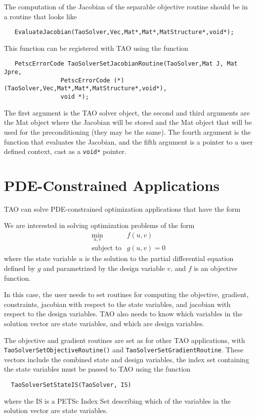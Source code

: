 The computation of the Jacobian of the separable objective routine 
should be in a routine that looks like
\begin{verbatim}
   EvaluateJacobian(TaoSolver,Vec,Mat*,Mat*,MatStructure*,void*);
\end{verbatim}
This function can be registered with TAO using the function
\begin{verbatim}
   PetscErrorCode TaoSolverSetJacobianRoutine(TaoSolver,Mat J, Mat Jpre,
                PetscErrorCode (*)(TaoSolver,Vec,Mat*,Mat*,MatStructure*,void*),
                void *);
\end{verbatim}
The first argument is the TAO solver object, the second and third arguments
are the Mat object where the Jacobian will be stored and the Mat object
that will be used for the preconditioning (they may be the same). The fourth 
argument is the function that evaluates the Jacobian, 
and the fifth argument is a pointer to a user defined context,
cast as a {\tt void*} pointer.

\section{PDE-Constrained Applications}\label{sec:pde_applications}
TAO can solve PDE-constrained optimization applications 
that have the form

We are interested in solving optimization problems of the form
\[
\begin{array}{ll}
\displaystyle \min_{u,v} & f(u,v) \\
\mbox{subject to} & g(u,v) = 0
\end{array}
\]
where the state variable $u$ is the solution to the partial differential 
equation defined by $g$ and parametrized by the design variable $v$, and 
$f$ is an objective function.  


In this case, the user needs to set routines for computing the objective,
gradient, constraints, jacobian with respect to the state variables, 
and jacobian with
respect to the design variables.  TAO also needs to know which variables
in the solution vector are state variables, and which are design variables.

The objective and gradient routines are set as for other TAO applications,
with {\tt TaoSolverSetObjectiveRoutine()} and {\tt TaoSolverSetGradientRoutine}.
These vectors include the combined state and design variables, the index set
containing the state variables must be passed to TAO using the function
\begin{verbatim}
  TaoSolverSetStateIS(TaoSolver, IS)
\end{verbatim}
where the IS is a PETSc Index Set describing which of the variables in the 
solution vector are state variables.

